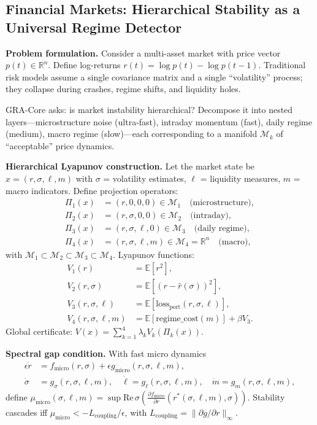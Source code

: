 \documentclass[11pt,a4paper]{article}
\begin{document}
\subsection{Financial Markets: Hierarchical Stability as a Universal Regime Detector}
\textbf{Problem formulation.} Consider a multi-asset market with price vector $p(t)\in\mathbb{R}^n$. Define log-returns $r(t)=\log p(t)-\log p(t-1)$. Traditional risk models assume a single covariance matrix and a single ``volatility'' process; they collapse during crashes, regime shifts, and liquidity holes.

GRA-Core asks: is market instability hierarchical? Decompose it into nested layers---microstructure noise (ultra-fast), intraday momentum (fast), daily regime (medium), macro regime (slow)---each corresponding to a manifold $\mathcal{M}_k$ of ``acceptable'' price dynamics.

\textbf{Hierarchical Lyapunov construction.} Let the market state be $x = (r,\sigma,\ell,m)$ with $\sigma$ = volatility estimates, $\ell$ = liquidity measures, $m$ = macro indicators. Define projection operators:
\begin{align*}
\Pi_1(x) &= (r,0,0,0) \in \mathcal{M}_1 \quad\text{(microstructure)},\\
\Pi_2(x) &= (r,\sigma,0,0) \in \mathcal{M}_2 \quad\text{(intraday)},\\
\Pi_3(x) &= (r,\sigma,\ell,0) \in \mathcal{M}_3 \quad\text{(daily regime)},\\
\Pi_4(x) &= (r,\sigma,\ell,m) \in \mathcal{M}_4 = \mathbb{R}^n \quad\text{(macro)},
\end{align*}
with $\mathcal{M}_1\subset\mathcal{M}_2\subset\mathcal{M}_3\subset\mathcal{M}_4$. Lyapunov functions:
\begin{align*}
V_1(r) &= \mathbb{E}[r^2],\\
V_2(r,\sigma) &= \mathbb{E}[(r-\hat{r}(\sigma))^2],\\
V_3(r,\sigma,\ell) &= \mathbb{E}[\text{loss}_{\text{port}}(r,\sigma,\ell)],\\
V_4(r,\sigma,\ell,m) &= \mathbb{E}[\text{regime\_cost}(m)] + \beta V_3.
\end{align*}
Global certificate: $V(x) = \sum_{k=1}^4 \lambda_k V_k(\Pi_k(x))$.

\textbf{Spectral gap condition.} With fast micro dynamics
\begin{align*}
\epsilon \dot{r} &= f_{\text{micro}}(r,\sigma) + \epsilon g_{\text{micro}}(r,\sigma,\ell,m),\\
\dot{\sigma} &= g_\sigma(r,\sigma,\ell,m), \quad \dot{\ell}=g_\ell(r,\sigma,\ell,m), \quad \dot{m}=g_m(r,\sigma,\ell,m),
\end{align*}
define $\mu_{\text{micro}}(\sigma,\ell,m) = \sup \mathrm{Re}\,\sigma\!\left(\frac{\partial f_{\text{micro}}}{\partial r}(r^*(\sigma,\ell,m),\sigma)\right)$. Stability cascades iff $\mu_{\text{micro}} < -L_{\text{coupling}}/\epsilon$, with $L_{\text{coupling}} = \|\partial g/\partial r\|_\infty$.
\end{document}

